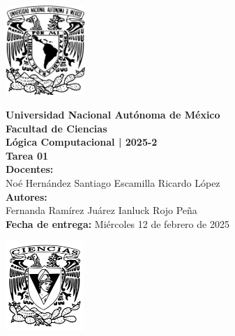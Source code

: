 \documentclass[11pt,letterpaper]{article}
\begin{document}
\begin{center}
  \begin{minipage}{3cm}
    \begin{center}
      \includegraphics[height=3.4cm]{../unam_logo.png}
    \end{center}
  \end{minipage}\hfill
  \begin{minipage}{10cm}
    \begin{center}
      \textbf{\Large Universidad Nacional Autónoma de México}\\[0.2cm]
      \textbf{\large Facultad de Ciencias}\\[0.2cm]
      \textbf{Lógica Computacional | 2025-2}\\[0.4cm]
      \textbf{\Large Tarea 01}\\[0.1cm]
      \textbf{Docentes:}\\
      Noé Hernández \hspace{1em} Santiago Escamilla \hspace{1em} Ricardo López\\[0.3cm]
      \textbf{Autores:}\\
      Fernanda Ramírez Juárez \quad Ianluck Rojo Peña\\[0.3cm]
      \textbf{Fecha de entrega:} Miércoles 12 de febrero de 2025
    \end{center}
  \end{minipage}\hfill
  \begin{minipage}{3cm}
    \begin{center}
      \includegraphics[height=3.4cm]{../fc_logo.png}
    \end{center}
  \end{minipage}
\end{center}
\end{document}
